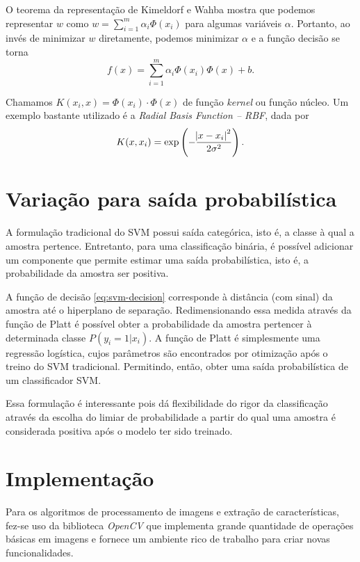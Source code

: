 O teorema da representação de Kimeldorf e Wahba mostra que podemos representar $w$ como $w=\sum_{i=1}^m \alpha_i \Phi(x_i)$ para algumas variáveis $\alpha$. Portanto, ao invés de minimizar $w$ diretamente, podemos minimizar $\alpha$ e a função decisão se torna
\begin{equation}
	\label{eq:svm-decision-func}
	f(x)=\sum_{i=1}^m \alpha_i \Phi(x_i) \Phi(x) +b.
\end{equation}

Chamamos $K(x_i, x) = \Phi(x_i) \cdot \Phi(x)$ de função \textit{kernel} ou função núcleo. Um exemplo bastante utilizado é a \textit{Radial Basis Function -- RBF}, dada por
\begin{equation}
	\label{eq:svm-kernel-func}
	K(x,x_i) = \exp\left(-\frac{\abs{x-x_i}^2}{2\sigma^2}\right).
\end{equation}

\section{Variação para saída probabilística}
\label{sec:svm-probabilistic}
A formulação tradicional do SVM possui saída categórica, isto é, a classe à qual a amostra pertence. Entretanto, para uma classificação binária, é possível adicionar um componente que permite estimar uma saída probabilística, isto é, a probabilidade da amostra ser positiva.

A função de decisão \eqref{eq:svm-decision} corresponde à distância (com sinal) da amostra até o hiperplano de separação. Redimensionando essa medida através da função de Platt \cite{svmProbabilisticOutput} é possível obter a probabilidade da amostra pertencer à determinada classe $P(y_i=1 | x_i)$. A função de Platt é simplesmente uma regressão logística, cujos parâmetros são encontrados por otimização após o treino do SVM tradicional. Permitindo, então, obter uma saída probabilística de um classificador SVM.

Essa formulação é interessante pois dá flexibilidade do rigor da classificação através da escolha do limiar de probabilidade a partir do qual uma amostra é considerada positiva após o modelo ter sido treinado.

\section{Implementação}
Para os algoritmos de processamento de imagens e extração de características, fez-se uso da biblioteca \textit{OpenCV} que implementa grande quantidade de operações básicas em imagens e fornece um ambiente rico de trabalho para criar novas funcionalidades.

